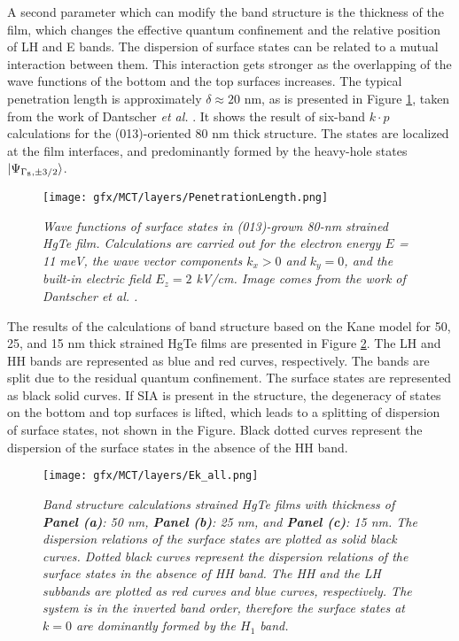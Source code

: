 \documentclass[titlepage,a4paper]{book}
\begin{document}
A second parameter which can modify the band structure is the thickness of the film, which changes the effective quantum confinement and the relative position of LH and E bands. The dispersion of surface states can be related to a mutual interaction between them. This interaction gets stronger as the overlapping of the wave functions of the bottom and the top surfaces increases. The typical penetration length is approximately $\delta \approx 20$ nm, as is presented in Figure \ref{fig:PenetrationLength}, taken from the work of Dantscher \textit{et al.} \cite{Ganichev_MCT_layers}. It shows the result of six-band $k\cdot p$ calculations for the (013)-oriented 80 nm thick structure. The states are localized at the film interfaces, and predominantly formed by the heavy-hole states $\ket{\Psi_{\Gamma_8, \pm 3/2}}$. 
\begin{figure}[ht]
	\centering
	\texttt{[image: gfx/MCT/layers/PenetrationLength.png]}
	\vspace{-10pt}
	\caption{\textit{Wave functions of surface states in (013)-grown 80-nm strained HgTe film. Calculations are carried out for the electron energy $E$ = 11 meV, the wave vector components $k_x > 0$ and $k_y = 0$, and the built-in electric field $E_z = 2$ kV/cm. Image comes from the work of Dantscher \textit{et al.} \cite{Ganichev_MCT_layers}.}}
	\label{fig:PenetrationLength}
\end{figure} 

The results of the calculations of band structure based on the Kane model for 50, 25, and 15 nm thick strained HgTe films are presented in Figure \ref{fig:Ek_all}. The LH and HH bands are represented as blue and red curves, respectively. The bands are split due to the residual quantum confinement. The surface states are represented as black solid curves. If SIA is present in the structure, the degeneracy of states on the bottom and top surfaces is lifted, which leads to a splitting of dispersion of surface states, not shown in the Figure. Black dotted curves represent the dispersion of the surface states in the absence of the HH band. 

\begin{figure}[H]
	\centering
	\texttt{[image: gfx/MCT/layers/Ek\_all.png]}
	\vspace{-10pt}
	\caption{\textit{Band structure calculations strained HgTe films with thickness of \textbf{Panel (a)}: 50 nm, \textbf{Panel (b)}: 25 nm, and \textbf{Panel (c)}: 15 nm. The dispersion relations of the surface states are plotted as solid black curves. Dotted black curves represent the dispersion relations of the surface states in the absence of HH band. The HH and the LH subbands are plotted as red curves and blue curves, respectively. The system is in the inverted band order, therefore the surface states at $k = 0$ are dominantly formed by the $H_1$ band.}}
	\label{fig:Ek_all}
\end{figure} 
\end{document}
